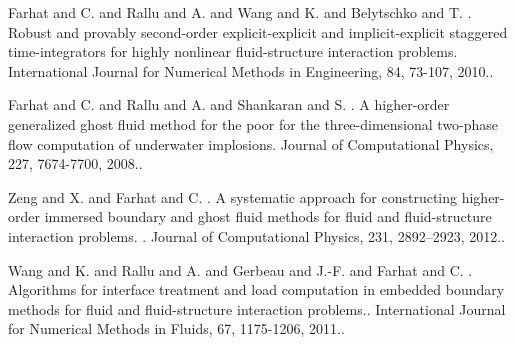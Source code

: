 \documentclass[article,A4,11pt]{llncs}%
\begin{document}

\begin{thebibliography}{10}
{\sc Farhat  and C.  and Rallu  and A.  and Wang  and K. and Belytschko and T. }. {Robust and provably second-order explicit-explicit and implicit-explicit staggered time-integrators for highly nonlinear fluid-structure interaction problems}. International Journal for Numerical Methods in Engineering, 84, 73-107, 2010..

{\sc Farhat  and C.  and Rallu  and A. and Shankaran and S. }. {A higher-order generalized ghost fluid method for the poor for the three-dimensional two-phase flow computation of underwater implosions}. Journal of Computational Physics, 227, 7674-7700, 2008..

{\sc Zeng  and X. and Farhat and C. }. {A systematic approach for constructing higher-order immersed boundary and ghost fluid methods for fluid and fluid-structure interaction problems. }. Journal of Computational Physics, 231, 2892–2923, 2012..

{\sc Wang  and K.  and Rallu  and A.  and Gerbeau  and J.-F. and Farhat and C. }. {Algorithms for interface treatment and load computation in embedded boundary methods for fluid and fluid-structure interaction problems.}. International Journal for Numerical Methods in Fluids, 67, 1175-1206, 2011..
\end{thebibliography}
\end{document}
